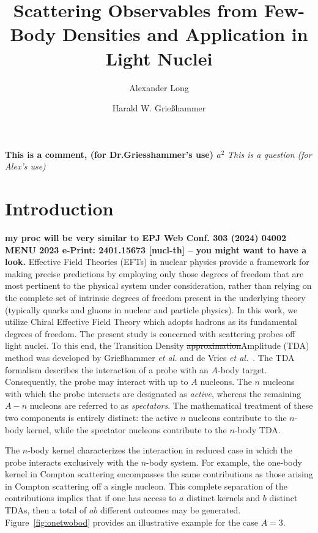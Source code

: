 \documentclass[a4paper,11pt]{article}
\title{Scattering Observables from Few-Body Densities and Application
in Light Nuclei}
\author*{Alexander Long}
\author{Harald W. Grie{\ss}hammer}
\affiliation{Institute for Nuclear Studies, Department of
Physics,\\George Washington University, Washington DC 20052, USA}
\newcommand{\ques}[1]{\color{red}\textit{ #1 }\color{black}}
\newcommand{\com}[1]{\color{blue}\small\textbf{ #1 }\color{black}\normalsize}
\newcommand{\replace}[2]{\sout{\protect#1}\color{blue}#2\color{black}}
\begin{document}
\maketitle
\com{This is a comment, (for Dr.Griesshammer's use) $a^2$}
\ques{This is a question (for Alex's use)}
\section{Introduction}
\com{my proc will be very similar to 
    EPJ Web Conf. 303 (2024) 04002
        MENU 2023
e-Print:    2401.15673 [nucl-th] -- you might want to have a look.}
Effective Field Theories (EFTs) in nuclear physics provide a
framework for making precise predictions by employing only those
degrees of freedom that are most pertinent to the physical system
under consideration, rather than relying on the complete set of
intrinsic degrees of freedom present in the underlying theory
(typically quarks and gluons in nuclear and particle physics). In this work, we utilize Chiral
Effective Field Theory which adopts hadrons
as its fundamental degrees of freedom.
The present study is concerned with scattering probes off
light nuclei. To this end, the Transition Density \replace{approximation}{Amplitude} (TDA)
method was developed by Grie\ss hammer \textit{et al.} and de Vries
\textit{et al.}~\cite{hammer2020, Vries2024}. The TDA formalism
describes the interaction of a probe with an $A$-body target.
Consequently, the probe may interact with up to $A$ nucleons. The $n$ nucleons with which the probe
interacts are designated as \textit{active}, whereas the remaining
$A-n$ nucleons are referred to as \textit{spectators}. The
mathematical treatment of these two components is entirely distinct:
the active $n$ nucleons contribute to the $n$-body kernel, while the
spectator nucleons contribute to the $n$-body TDA.

The $n$-body kernel characterizes the interaction in reduced case
in which the probe interacts exclusively with the $n$-body
system. For example, the one-body kernel in Compton scattering
encompasses the same contributions as those arising in Compton
scattering off a single nucleon. This complete separation of the
contributions implies that if one has access to $a$ distinct kernels
and $b$ distinct TDAs, then a total of $ab$ different outcomes may be
generated. Figure~\ref{fig:onetwobod} provides an illustrative
example for the case $A=3$.
\end{document}
